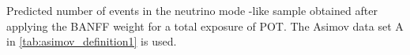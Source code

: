 
\begin{table}[H]
\center

\caption{
Predicted number of events in the neutrino mode \nueCConepi{}-like sample obtained after applying the BANFF weight
for a total exposure of \TotalPotNu{} POT. The Asimov data set A in \ref{tab:asimov_definition1} is used.
}
\label{tab:events_cconepi_Asimov_A}
\end{table}


